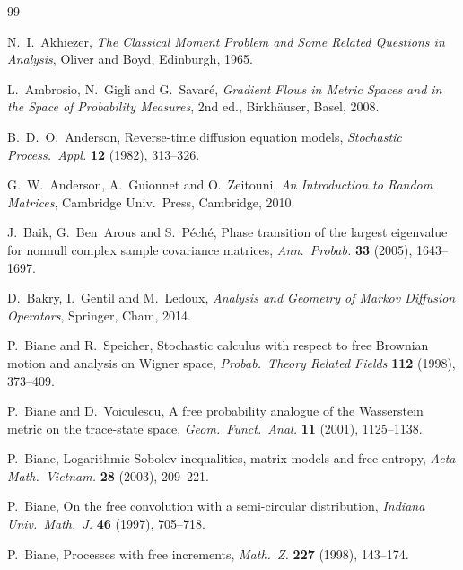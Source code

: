 \documentclass[11pt]{article}
\theoremstyle{plain}
\theoremstyle{definition}
\theoremstyle{remark}
\begin{document}
\begin{singlespace}
\begin{thebibliography}{99}

N.~I.~Akhiezer,
\emph{The Classical Moment Problem and Some Related Questions in Analysis},
Oliver and Boyd, Edinburgh, 1965.

L.~Ambrosio, N.~Gigli and G.~Savar\'e,
\emph{Gradient Flows in Metric Spaces and in the Space of Probability Measures},
2nd ed., Birkh\"auser, Basel, 2008.

B.~D.~O.~Anderson,
Reverse-time diffusion equation models,
\emph{Stochastic Process.\ Appl.} \textbf{12} (1982), 313--326.

G.~W.~Anderson, A.~Guionnet and O.~Zeitouni,
\emph{An Introduction to Random Matrices}, Cambridge Univ.\ Press, Cambridge, 2010.

J.~Baik, G.~Ben~Arous and S.~P\'ech\'e,
Phase transition of the largest eigenvalue for nonnull complex sample covariance
matrices, \emph{Ann.\ Probab.} \textbf{33} (2005), 1643--1697.

D.~Bakry, I.~Gentil and M.~Ledoux,
\emph{Analysis and Geometry of Markov Diffusion Operators}, Springer, Cham, 2014.

P.~Biane and R.~Speicher,
Stochastic calculus with respect to free Brownian motion and analysis on Wigner space,
\emph{Probab.\ Theory Related Fields} \textbf{112} (1998), 373--409.

P.~Biane and D.~Voiculescu,
A free probability analogue of the Wasserstein metric on the trace-state space,
\emph{Geom.\ Funct.\ Anal.} \textbf{11} (2001), 1125--1138.

P.~Biane,
Logarithmic Sobolev inequalities, matrix models and free entropy,
\emph{Acta Math.\ Vietnam.} \textbf{28} (2003), 209--221.

P.~Biane,
On the free convolution with a semi-circular distribution,
\emph{Indiana Univ.\ Math.\ J.} \textbf{46} (1997), 705--718.

P.~Biane,
Processes with free increments,
\emph{Math.\ Z.} \textbf{227} (1998), 143--174.


\end{thebibliography}
\end{singlespace}
\end{document}
